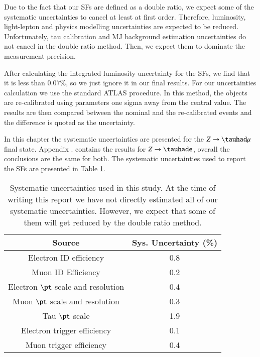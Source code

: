 Due to the fact that our SFs are defined as a double ratio, we expect some of the systematic uncertainties to cancel at least at first order. Therefore, luminosity, light-lepton and physics modelling uncertainties are expected to be reduced. Unfortunately, tau calibration and MJ background estimation uncertainties do not cancel in the double ratio method. Then, we expect them to dominate the measurement precision.

After calculating the integrated luminosity uncertainty for the SFs, we find that it is less than $0.07\%$, so we just ignore it in our final results. For our uncertainties calculation we use the standard ATLAS procedure. In this method, the objects are re-calibrated using parameters one sigma away from the central value. The results are then compared between the nominal and the re-calibrated events and the difference is quoted as the uncertainty. 

In this chapter the systematic uncertainties are presented for the $Z\to\tauhad\mu$ final state. Appendix . contains the results for $Z\to\tauhade$, overall the conclusions are the same for both. The systematic uncertainties used to report the SFs are presented in Table \ref{Tab5}. 
\begin{table}[htbp]
	\centering
	\begin{tabular}{cc}
		\hline
		\multicolumn{1}{|c|}{Source}        & \multicolumn{1}{c|}{Sys. Uncertainty (\%)} \\ \hline
		Electron ID efficiency              & 0.8                                        \\
		Muon ID Efficiency                  & 0.2                                        \\
		Electron $\pt$ scale and resolution & 0.4                                        \\
		Muon $\pt$ scale and resolution     & 0.3                                        \\
		Tau $\pt$ scale                     & 1.9                                        \\
		Electron trigger efficiency         & 0.1                                        \\
		Muon trigger efficiency             & 0.4                                        \\ 
	\end{tabular}
	\caption{Systematic uncertainties used in this study. At the time of writing this report we have not directly estimated all of our systematic uncertainties. However, we expect that some of them will get reduced by the double ratio method.}
	\label{Tab5}
\end{table}

